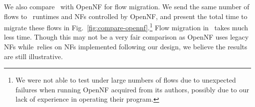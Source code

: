 We also compare \nfactor~with OpenNF \cite{gember2015opennf} for flow migration. We send the same number of flows to \nfactor~runtimes and NFs controlled by OpenNF, and present the total time to migrate these flows in Fig.~\ref{fig:compare-opennf}.\footnote{We were not able to test under large numbers of flows due to unexpected failures when running OpenNF acquired from its authors, possibly due to our lack of experience in operating their program.} Flow migration in \nfactor~takes much less time. Though this may not be a very fair comparison as OpenNF uses legacy NFs while\nfactor~relies on NFs implemented following our design, we believe the results are still illustrative.





